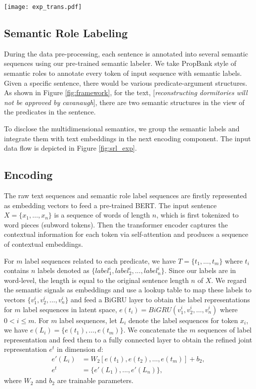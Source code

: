 \documentclass[letterpaper]{article} \usepackage{aaai20}  \usepackage{times}  \usepackage{helvet} \usepackage{courier}  \usepackage[hyphens]{url}  \usepackage{graphicx} \urlstyle{rm} \def\UrlFont{\rm}  \usepackage{graphicx}  \frenchspacing  \usepackage{amssymb}
\begin{document}
\begin{figure*}
	\centering
	\texttt{[image: exp\_trans.pdf]}
	\caption{\label{fig:srl_exp}The input representation flow.}
\end{figure*}

\subsection{Semantic Role Labeling}
During the data pre-processing, each sentence is annotated into several semantic sequences using our pre-trained semantic labeler. We take PropBank style \cite{palmer2005proposition} of semantic roles to annotate every token of input sequence with semantic labels. Given a specific sentence, there would be various predicate-argument structures. As shown in Figure \ref{fig:framework}, for the text, [\emph{reconstructing dormitories will not be approved by cavanaugh}], there are two semantic structures in the view of the predicates in the sentence.

To disclose the multidimensional semantics, we group the semantic labels and integrate them with text embeddings in the next encoding component. The input data flow is depicted in Figure \ref{fig:srl_exp}.


\subsection{Encoding}
The raw text sequences and semantic role label sequences are firstly represented as embedding vectors to feed a pre-trained BERT. The input sentence $X=\{x_1, \dots, x_n\}$ is a sequence of words of length $n$, which is first tokenized to word pieces (subword tokens). Then the transformer encoder captures the contextual information for each token via self-attention and produces a sequence of contextual embeddings. 

For $m$ label sequences related to each predicate, we have $T=\{t_1, \dots, t_m\}$ where $t_i$ contains $n$ labels denoted as $\{label^i_1, label^i_2, ..., label^i_n\}$. Since our labels are in word-level, the length is equal to the original sentence length $n$ of $X$. We regard the semantic signals as embeddings and use a lookup table to map these labels to vectors $\{v^i_1, v^i_2, ..., v^i_n\}$ and feed a BiGRU layer to obtain the label representations for $m$ label sequences in latent space, $e(t_i)=BiGRU(v^i_1, v^i_2, \dots, v^i_n)$ where $0< i \leqslant  m$. For $m$ label sequences, let $L_i$ denote the label sequences for token $x_i$, we have $e(L_i)=\{e(t_1), \dots, e(t_m)\}$. We concatenate the $m$ sequences of label representation and feed them to a fully connected layer to obtain the refined joint representation $e^t$ in dimension $d$:
\begin{equation}
\begin{split}
e'(L_i) &= W_2\left[e(t_1), e(t_2), \dots, e(t_{m})\right] + b_2, \\
e^t &= \{e'(L_1),...,e'(L_n)\},
\end{split}
\end{equation}
where $W_2$ and $b_2$ are trainable parameters.
\end{document}
